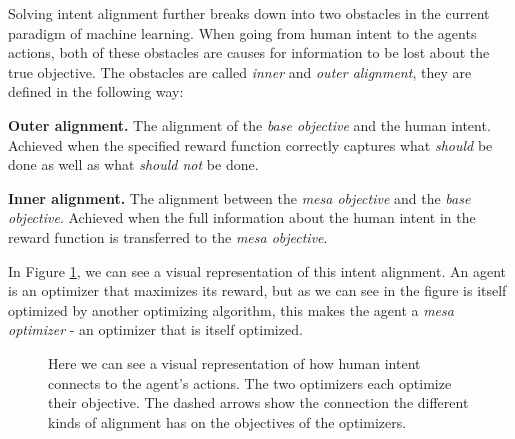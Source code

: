 \documentclass[12pt,A4]{report}
\newcommand{\autobaj}{}
\theoremstyle{definition}
\begin{document}
Solving intent alignment further breaks down into two obstacles in the current paradigm of machine learning. When going from human intent to the agents actions, both of these obstacles are causes for information to be lost about the true objective. The obstacles are called \textit{inner} and \textit{outer alignment}, they are defined in the following way:

\begin{displayquote} 
\textbf{Outer alignment.} 
The alignment of the \textit{base objective} and the human intent. Achieved when the specified reward function correctly captures what \textit{should} be done as well as what \textit{should not} be done.
\end{displayquote} 

\begin{displayquote} 
  \textbf{Inner alignment.} 
The alignment between the \textit{mesa objective} and the \textit{base objective}. Achieved when the full information about the human intent in the reward function is transferred to the \textit{mesa objective}.
\end{displayquote} 

In Figure \ref{fig:alignment}, we can see a visual representation of this intent alignment. An agent is an optimizer that maximizes its reward, but as we can see in the figure is itself optimized by another optimizing algorithm, this makes the agent a \textit{mesa optimizer} - an optimizer that is itself optimized. 



\begin{figure}[H]
  
  \caption{Here we can see a visual representation of how human intent connects to the agent's actions. The two optimizers each optimize their objective. The dashed arrows show the connection the different kinds of alignment has on the objectives of the optimizers.}
  \label{fig:alignment}
\end{figure}



\end{document}
